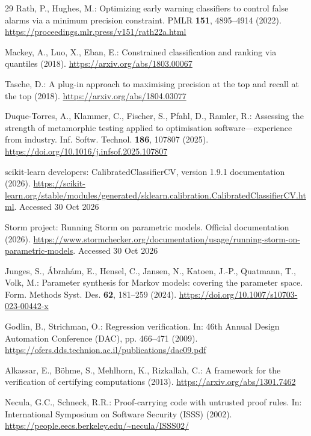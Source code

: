 \documentclass[11pt,a4paper]{article}
\theoremstyle{plain}
\theoremstyle{definition}
\theoremstyle{remark}
\begin{document}
\begingroup
\footnotesize
\setlength{\itemsep}{0.5pt plus 0.2pt minus 0.1pt}
\setlength{\parskip}{0pt}
\begin{thebibliography}{29}
Rath, P., Hughes, M.: Optimizing early warning classifiers to control false alarms via a minimum precision constraint. PMLR \textbf{151}, 4895--4914 (2022). \url{https://proceedings.mlr.press/v151/rath22a.html}

Mackey, A., Luo, X., Eban, E.: Constrained classification and ranking via quantiles (2018). \url{https://arxiv.org/abs/1803.00067}

Tasche, D.: A plug-in approach to maximising precision at the top and recall at the top (2018). \url{https://arxiv.org/abs/1804.03077}

Duque-Torres, A., Klammer, C., Fischer, S., Pfahl, D., Ramler, R.: Assessing the strength of metamorphic testing applied to optimisation software---experience from industry. Inf. Softw. Technol. \textbf{186}, 107807 (2025). \url{https://doi.org/10.1016/j.infsof.2025.107807}

scikit-learn developers: CalibratedClassifierCV, version 1.9.1 documentation (2026). \url{https://scikit-learn.org/stable/modules/generated/sklearn.calibration.CalibratedClassifierCV.html}. Accessed 30 Oct 2026

Storm project: Running Storm on parametric models. Official documentation (2026). \url{https://www.stormchecker.org/documentation/usage/running-storm-on-parametric-models}. Accessed 30 Oct 2026

Junges, S., \'{A}brah\'{a}m, E., Hensel, C., Jansen, N., Katoen, J.-P., Quatmann, T., Volk, M.: Parameter synthesis for Markov models: covering the parameter space. Form. Methods Syst. Des. \textbf{62}, 181--259 (2024). \url{https://doi.org/10.1007/s10703-023-00442-x}

Godlin, B., Strichman, O.: Regression verification. In: 46th Annual Design Automation Conference (DAC), pp. 466--471 (2009). \url{https://ofers.dds.technion.ac.il/publications/dac09.pdf}

Alkassar, E., B\"{o}hme, S., Mehlhorn, K., Rizkallah, C.: A framework for the verification of certifying computations (2013). \url{https://arxiv.org/abs/1301.7462}

Necula, G.C., Schneck, R.R.: Proof-carrying code with untrusted proof rules. In: International Symposium on Software Security (ISSS) (2002). \url{https://people.eecs.berkeley.edu/~necula/ISSS02/}


\end{thebibliography}
\end{document}
